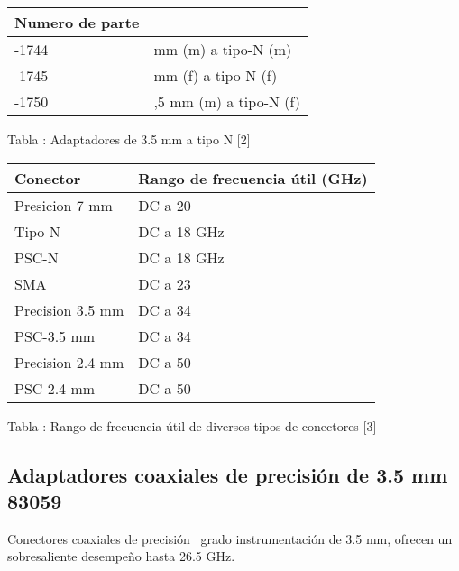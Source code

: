 \begin{center}
	\tablefirsthead{}
	\tablehead{}
	\tabletail{}
	\tablelasttail{}
	\begin{supertabular}{|m{2.677cm}|m{3.793cm}|}
		\hline
		\centering Numero de parte &
		~
		\\\hline
		-1744 &
		 mm (m) a tipo-N (m)\\\hline
		-1745 &
		 mm (f) a tipo-N (f)\\\hline
		-1750 &
		,5 mm (m) a tipo-N (f)\\\hline
	\end{supertabular}
\end{center}
Tabla : Adaptadores de 3.5 mm a tipo N [2]	

\begin{center}
	\tablefirsthead{}
	\tablehead{}
	\tabletail{}
	\tablelasttail{}
	\begin{supertabular}{|m{2.756cm}|m{5.1660004cm}|}
		\hline
		\centering Conector &
		\centering Rango de frecuencia útil (GHz)\\\hline
		\centering Presicion 7 mm &
		\centering DC a 20\\\hline
		\centering Tipo N &
		\centering DC a 18 GHz\\\hline
		\centering PSC-N &
		\centering DC a 18 GHz\\\hline
		\centering SMA &
		\centering DC a 23\\\hline
		\centering Precision 3.5 mm &
		\centering DC a 34\\\hline
		\centering PSC-3.5 mm &
		\centering DC a 34\\\hline
		\centering Precision 2.4 mm &
		\centering DC a 50\\\hline
		\centering PSC-2.4 mm &
		\centering DC a 50\\\hline
	\end{supertabular}
\end{center}

Tabla : Rango de frecuencia útil de diversos tipos de conectores [3]		
\subsection{Adaptadores coaxiales de precisión de 3.5 mm 83059}

Conectores coaxiales de precisión \ grado instrumentación de 3.5 mm, ofrecen un sobresaliente desempeño hasta 26.5 GHz.

